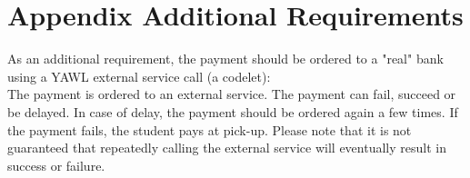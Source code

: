 \section{Appendix Additional Requirements}\label{app:appendix_additional}
As an additional requirement, the payment should be ordered to a "real" bank
using a YAWL external service call (a codelet):\\
The payment is ordered to an external service. The payment can fail, succeed
or be delayed. In case of delay, the payment should be ordered again a few times.
If the payment fails, the student pays at pick-up. Please note that it is not
guaranteed that repeatedly calling the external service will eventually result in
success or failure.\\

\clearpage
